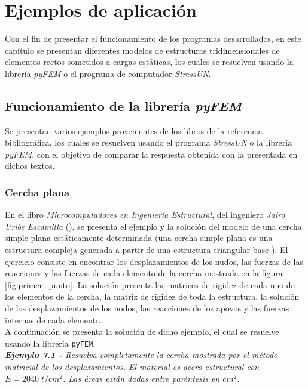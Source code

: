 \chapter{Ejemplos de aplicación}
\label{chap:ejemplos_aplicacion}

Con el fin de presentar el funcionamiento de los programas desarrollados, en este capítulo se presentan diferentes modelos de estructuras tridimensionales de elementos rectos sometidos a cargas estáticas, los cuales se resuelven usando la librería \textit{pyFEM} o el programa de computador \textit{StressUN}. \\

\section{Funcionamiento de la librería \textit{pyFEM}} \label{sec:libreriaPyFem}
Se presentan varios ejemplos provenientes de los libros de la referencia bibliográfica, los cuales se resuelven usando el programa \textit{StressUN} o la librería \textit{pyFEM}, con el objetivo de comparar la respuesta obtenida con la presentada en dichos textos.

\subsection{Cercha plana}

En el libro \textit{Microcomputadores en Ingeniería Estructural}, del ingeniero \textit{Jairo Uribe Escamilla} (\cite{escamilla1995microcomputadores}), se presenta el ejemplo y la solución del modelo de una cercha simple plana estáticamente determinada (una cercha simple plana es una estructura compleja generada a partir de una estructura triangular base \cite{beer1997mecanica}). El ejercicio consiste en encontrar los desplazamientos de los nudos, las fuerzas de las reacciones y las fuerzas de cada elemento de la cercha mostrada en la figura \ref{fig:primer_punto}. La solución presenta las matrices de rigidez de cada uno de los elementos de la cercha, la matriz de rigidez de toda la estructura, la solución de los desplazamientos de los nodos, las reacciones de los apoyos y las fuerzas internas de cada elemento.\\

A continuación se presenta la solución de dicho ejemplo, el cual se resuelve usando la librería \texttt{pyFEM}. \\

\textit{\textbf{Ejemplo 7.1 -} Resuelva completamente la cercha mostrada por el método matricial de los desplazamientos. El material es acero estructural con $ E = 2040\; t / cm^2 $. Las áreas están dadas entre paréntesis en $ cm^2 $.}\\

